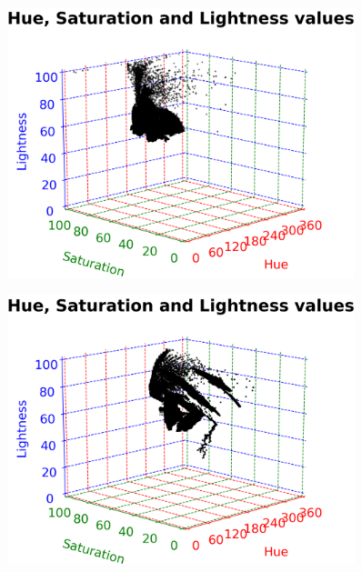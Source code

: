 \vspace{1mm}

\begin{figure}[h!]
	\centering
	\begin{minipage}{0.5\textwidth}
		\centering
		\includegraphics[width=0.9\textwidth]{img/hsl3DBlue.png}
		\captionsetup{width=0.9\textwidth}
		\label{hsl3DBluePlot}
	\end{minipage}%
	\begin{minipage}{0.5\textwidth}
		\centering
		\includegraphics[width=0.9\textwidth]{img/hsl3DPink.png}
		\captionsetup{width=0.9\textwidth}
		\label{hsl3DPinkPlot}
	\end{minipage}
\end{figure}


